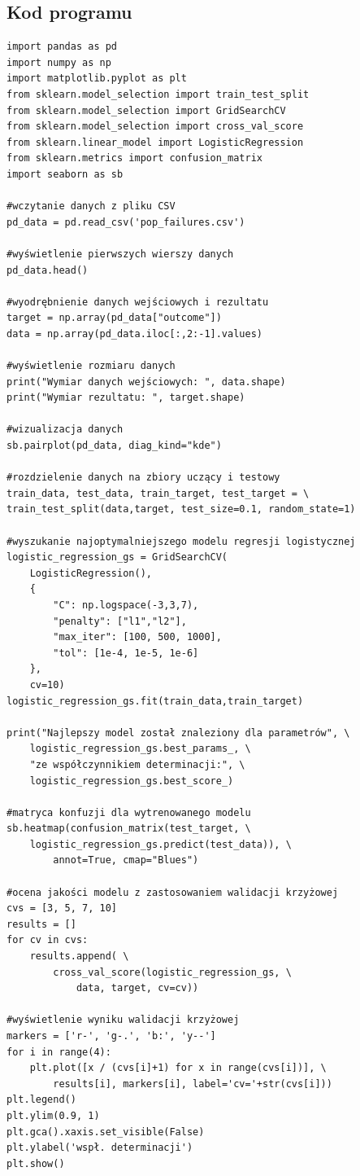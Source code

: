 \documentclass[11pt, a4paper, notitlepage]{report}
\begin{document}
\begin{appendices}
\chapter{Kod programu}
\begin{verbatim}
import pandas as pd
import numpy as np
import matplotlib.pyplot as plt
from sklearn.model_selection import train_test_split
from sklearn.model_selection import GridSearchCV
from sklearn.model_selection import cross_val_score
from sklearn.linear_model import LogisticRegression
from sklearn.metrics import confusion_matrix
import seaborn as sb
	
#wczytanie danych z pliku CSV
pd_data = pd.read_csv('pop_failures.csv')

#wyświetlenie pierwszych wierszy danych
pd_data.head()

#wyodrębnienie danych wejściowych i rezultatu
target = np.array(pd_data["outcome"])
data = np.array(pd_data.iloc[:,2:-1].values)

#wyświetlenie rozmiaru danych
print("Wymiar danych wejściowych: ", data.shape)
print("Wymiar rezultatu: ", target.shape)

#wizualizacja danych
sb.pairplot(pd_data, diag_kind="kde")

#rozdzielenie danych na zbiory uczący i testowy
train_data, test_data, train_target, test_target = \
train_test_split(data,target, test_size=0.1, random_state=1)

#wyszukanie najoptymalniejszego modelu regresji logistycznej
logistic_regression_gs = GridSearchCV(
    LogisticRegression(),
    {
        "C": np.logspace(-3,3,7), 
        "penalty": ["l1","l2"],
        "max_iter": [100, 500, 1000],
        "tol": [1e-4, 1e-5, 1e-6]
    },
    cv=10)
logistic_regression_gs.fit(train_data,train_target)

print("Najlepszy model został znaleziony dla parametrów", \ 
    logistic_regression_gs.best_params_, \
    "ze współczynnikiem determinacji:", \ 
    logistic_regression_gs.best_score_)

#matryca konfuzji dla wytrenowanego modelu
sb.heatmap(confusion_matrix(test_target, \
    logistic_regression_gs.predict(test_data)), \ 
        annot=True, cmap="Blues")

#ocena jakości modelu z zastosowaniem walidacji krzyżowej
cvs = [3, 5, 7, 10]
results = []
for cv in cvs:
    results.append( \
        cross_val_score(logistic_regression_gs, \ 
            data, target, cv=cv))
	
#wyświetlenie wyniku walidacji krzyżowej
markers = ['r-', 'g-.', 'b:', 'y--']
for i in range(4):
    plt.plot([x / (cvs[i]+1) for x in range(cvs[i])], \
        results[i], markers[i], label='cv='+str(cvs[i]))
plt.legend()
plt.ylim(0.9, 1)
plt.gca().xaxis.set_visible(False)
plt.ylabel('wspł. determinacji')
plt.show()
\end{verbatim}
\end{appendices}
\end{document}
